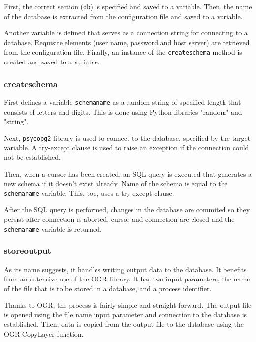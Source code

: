 First, the correct section (\texttt{db}) is specified and saved to a variable. Then, the name of the database is extracted from the configuration file and saved to a variable. 

Another variable is defined that serves as a connection string for connecting to a database. Requisite elements (user name, password and host server) are retrieved from the configuration file. Finally, an instance of the \texttt{\textunderscore create\textunderscore schema} method is created and saved to a variable.


\subsubsection{\textunderscore create\textunderscore schema} 
First defines a variable \texttt{schema\textunderscore name} as a random string of specified length that consists of letters and digits. This is done using Python libraries "random" and "string".  
 

Next, \texttt{psycopg2} library is used to connect to the database, specified by the target variable. A try-except clause is used to raise an exception if the connection could not be established. 

Then, when a cursor has been created, an SQL query is executed that generates a new schema if it doesn't exist already. Name of the schema is equal to the \texttt{schema\textunderscore name} variable. This, too, uses a try-except clause.

After the SQL query is performed, changes in the database are commited so they persist after connection is aborted, cursor and connection are closed and the \texttt{schema\textunderscore name} variable is returned.

\subsubsection{\textunderscore store\textunderscore output} 
As its name suggests, it handles writing output data to the database. It benefits from an extensive use of the OGR library. It has two input parameters, the name of the file that is to be stored in a database, and a process identifier. 

Thanks to OGR, the process is fairly simple and straight-forward. The output file is opened using the file name input parameter and connection to the database is established. Then, data is copied from the output file to the database using the OGR CopyLayer function. 

